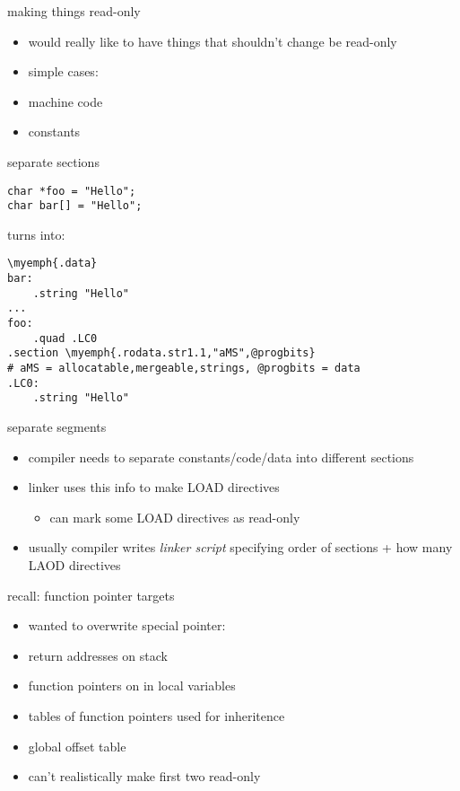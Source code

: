 \begin{frame}{making things read-only}
    \begin{itemize}
    \item would really like to have things that shouldn't change be read-only
    \vspace{.5cm}
    \item simple cases:
    \item machine code
    \item constants
    \end{itemize}
\end{frame}

\begin{frame}[fragile]{separate sections}
\begin{Verbatim}[fontsize=\small]
char *foo = "Hello";
char bar[] = "Hello";
\end{Verbatim}
turns into:
\begin{Verbatim}[fontsize=\small,commandchars=\\\{\}]
\myemph{.data}
bar:
    .string "Hello"
...
foo:
    .quad .LC0
.section \myemph{.rodata.str1.1,"aMS",@progbits}
# aMS = allocatable,mergeable,strings, @progbits = data
.LC0:
    .string "Hello"
\end{Verbatim}
\end{frame}

\begin{frame}{separate segments}
\begin{itemize}
\item compiler needs to separate constants/code/data into different sections
\item linker uses this info to make LOAD directives
    \begin{itemize}
    \item can mark some LOAD directives as read-only
    \end{itemize}
\item usually compiler writes \textit{linker script} specifying order of sections + how many LAOD directives
\end{itemize}
\end{frame}


\begin{frame}{recall: function pointer targets}
    \begin{itemize}
    \item wanted to overwrite special pointer:
    \vspace{.5cm}
    \item return addresses on stack
    \item function pointers on in local variables
    \item tables of function pointers used for inheritence
    \item global offset table
    \vspace{.5cm}
    \item can't realistically make first two read-only
    \end{itemize}
\end{frame}

